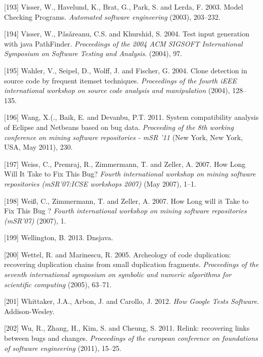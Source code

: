 \documentclass[12pt]{report}
\begin{document}
\hypertarget{ref-Visser2003}{}
{[}193{]} Visser, W., Havelund, K., Brat, G., Park, S. and Lerda, F.
2003. Model Checking Programs. \emph{Automated software engineering}
(2003), 203--232.

\hypertarget{ref-Visser2004}{}
{[}194{]} Visser, W., Pǎsǎreanu, C.S. and Khurshid, S. 2004. Test input
generation with java PathFinder. \emph{Proceedings of the 2004 ACM
SIGSOFT International Symposium on Software Testing and Analysis}.
(2004), 97.

\hypertarget{ref-Wahler}{}
{[}195{]} Wahler, V., Seipel, D., Wolff, J. and Fischer, G. 2004. Clone
detection in source code by frequent itemset techniques.
\emph{Proceedings of the fourth iEEE international workshop on source
code analysis and manipulation} (2004), 128--135.

\hypertarget{ref-Wang2011}{}
{[}196{]} Wang, X.(., Baik, E. and Devanbu, P.T. 2011. System
compatibility analysis of Eclipse and Netbeans based on bug data.
\emph{Proceeding of the 8th working conference on mining software
repositories - mSR '11} (New York, New York, USA, May 2011), 230.

\hypertarget{ref-Weiss2007}{}
{[}197{]} Weiss, C., Premraj, R., Zimmermann, T. and Zeller, A. 2007.
How Long Will It Take to Fix This Bug? \emph{Fourth international
workshop on mining software repositories (mSR'07:ICSE workshops 2007)}
(May 2007), 1--1.

\hypertarget{ref-Weiuxdf2007}{}
{[}198{]} Weiß, C., Zimmermann, T. and Zeller, A. 2007. How Long will it
Take to Fix This Bug ? \emph{Fourth international workshop on mining
software repositories (mSR'07)} (2007), 1.

\hypertarget{ref-Wellington2013}{}
{[}199{]} Wellington, B. 2013. Dnsjava.

\hypertarget{ref-Wettel2005}{}
{[}200{]} Wettel, R. and Marinescu, R. 2005. Archeology of code
duplication: recovering duplication chains from small duplication
fragments. \emph{Proceedings of the seventh international symposium on
symbolic and numeric algorithms for scientific computing} (2005),
63--71.

\hypertarget{ref-Whittaker2012}{}
{[}201{]} Whittaker, J.A., Arbon, J. and Carollo, J. 2012. \emph{How
Google Tests Software}. Addison-Wesley.

\hypertarget{ref-Wu2011}{}
{[}202{]} Wu, R., Zhang, H., Kim, S. and Cheung, S. 2011. Relink:
recovering links between bugs and changes. \emph{Proceedings of the
european conference on foundations of software engineering} (2011),
15--25.
\end{document}
